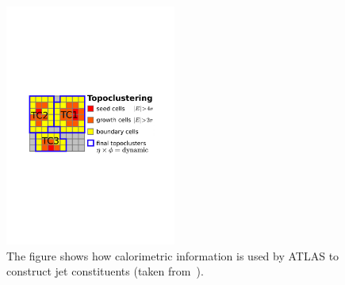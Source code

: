 \vspace{0.3cm}

\begin{figure}
 \centering
  \includegraphics[width=0.5\textwidth]{figures/topocluster.pdf}
  \caption{The figure shows how calorimetric information is used by ATLAS to construct jet constituents (taken from~\cite{boosttalk}).}
  \label{fig:topoclusters}
\end{figure}

